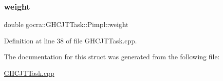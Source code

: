 \subsubsection{\texorpdfstring{weight}{weight}}
{\footnotesize\ttfamily double gocra\+::\+G\+H\+C\+J\+T\+Task\+::\+Pimpl\+::weight}



Definition at line 38 of file G\+H\+C\+J\+T\+Task.\+cpp.



The documentation for this struct was generated from the following file\+:\begin{DoxyCompactItemize}
\item 
\hyperlink{GHCJTTask_8cpp}{G\+H\+C\+J\+T\+Task.\+cpp}\end{DoxyCompactItemize}
